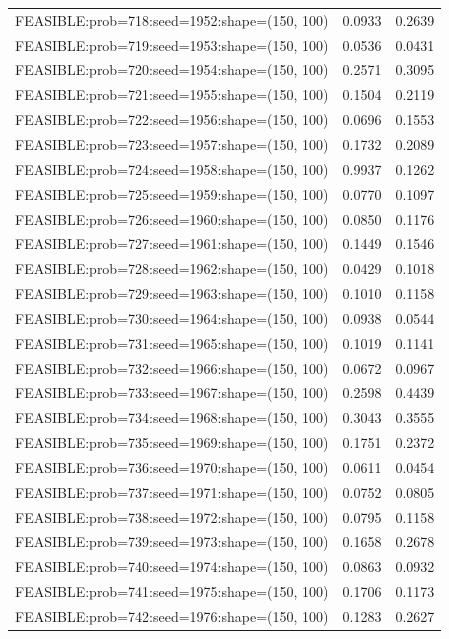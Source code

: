\begin{longtable}{lcc}
FEASIBLE:prob=718:seed=1952:shape=(150, 100) &   0.0933 & 0.2639 \\
FEASIBLE:prob=719:seed=1953:shape=(150, 100) &   0.0536 & 0.0431 \\
FEASIBLE:prob=720:seed=1954:shape=(150, 100) &   0.2571 & 0.3095 \\
FEASIBLE:prob=721:seed=1955:shape=(150, 100) &   0.1504 & 0.2119 \\
FEASIBLE:prob=722:seed=1956:shape=(150, 100) &   0.0696 & 0.1553 \\
FEASIBLE:prob=723:seed=1957:shape=(150, 100) &   0.1732 & 0.2089 \\
FEASIBLE:prob=724:seed=1958:shape=(150, 100) &   0.9937 & 0.1262 \\
FEASIBLE:prob=725:seed=1959:shape=(150, 100) &   0.0770 & 0.1097 \\
FEASIBLE:prob=726:seed=1960:shape=(150, 100) &   0.0850 & 0.1176 \\
FEASIBLE:prob=727:seed=1961:shape=(150, 100) &   0.1449 & 0.1546 \\
FEASIBLE:prob=728:seed=1962:shape=(150, 100) &   0.0429 & 0.1018 \\
FEASIBLE:prob=729:seed=1963:shape=(150, 100) &   0.1010 & 0.1158 \\
FEASIBLE:prob=730:seed=1964:shape=(150, 100) &   0.0938 & 0.0544 \\
FEASIBLE:prob=731:seed=1965:shape=(150, 100) &   0.1019 & 0.1141 \\
FEASIBLE:prob=732:seed=1966:shape=(150, 100) &   0.0672 & 0.0967 \\
FEASIBLE:prob=733:seed=1967:shape=(150, 100) &   0.2598 & 0.4439 \\
FEASIBLE:prob=734:seed=1968:shape=(150, 100) &   0.3043 & 0.3555 \\
FEASIBLE:prob=735:seed=1969:shape=(150, 100) &   0.1751 & 0.2372 \\
FEASIBLE:prob=736:seed=1970:shape=(150, 100) &   0.0611 & 0.0454 \\
FEASIBLE:prob=737:seed=1971:shape=(150, 100) &   0.0752 & 0.0805 \\
FEASIBLE:prob=738:seed=1972:shape=(150, 100) &   0.0795 & 0.1158 \\
FEASIBLE:prob=739:seed=1973:shape=(150, 100) &   0.1658 & 0.2678 \\
FEASIBLE:prob=740:seed=1974:shape=(150, 100) &   0.0863 & 0.0932 \\
FEASIBLE:prob=741:seed=1975:shape=(150, 100) &   0.1706 & 0.1173 \\
FEASIBLE:prob=742:seed=1976:shape=(150, 100) &   0.1283 & 0.2627 \\

\end{longtable}
